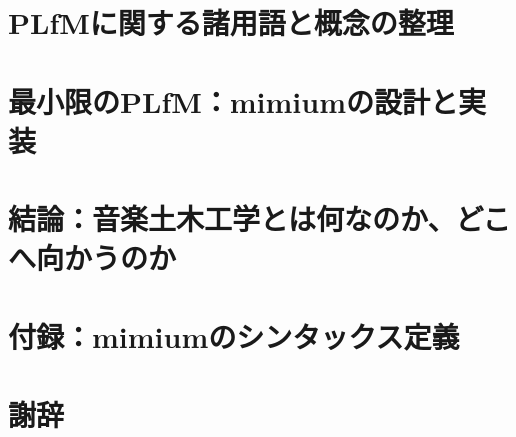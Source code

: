 \documentclass[luatex,unicode,titlepage,pdfusetitle,a4paper,openany]{ltjsbook}
\begin{document}
\chapter{PLfMに関する諸用語と概念の整理}\label{sec:chapter5}


\chapter{最小限のPLfM：mimiumの設計と実装}\label{sec:chapter6}


\chapter{結論：音楽土木工学とは何なのか、どこへ向かうのか}\label{sec:chapter7}


\backmatter

\appendix
\chapter{付録：mimiumのシンタックス定義}\label{sec:appendA}


{}
\printbibliography[title = 参考文献]

{}
\chapter*{謝辞}

\end{document}
